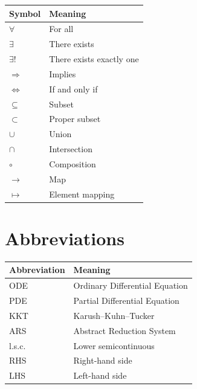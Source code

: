 \documentclass[11pt]{book}
\numberwithin{equation}{chapter}
\theoremstyle{definition}
\theoremstyle{plain}
\begin{document}
\begin{center}

\begin{tabular}{ll}

Symbol & Meaning
\\
\hline

$\forall$ &
For all
\\

$\exists$ &
There exists
\\

$\exists !$ &
There exists exactly one
\\

$\Rightarrow$ &
Implies
\\

$\Leftrightarrow$ &
If and only if
\\

$\subseteq$ &
Subset
\\

$\subset$ &
Proper subset
\\

$\cup$ &
Union
\\

$\cap$ &
Intersection
\\

$\circ$ &
Composition
\\

$\longrightarrow$ &
Map
\\

$\mapsto$ &
Element mapping

\end{tabular}

\end{center}


\section{Abbreviations}

\begin{center}

\begin{tabular}{ll}

Abbreviation & Meaning
\\
\hline

ODE &
Ordinary Differential Equation
\\

PDE &
Partial Differential Equation
\\

KKT &
Karush--Kuhn--Tucker
\\

ARS &
Abstract Reduction System
\\

l.s.c. &
Lower semicontinuous
\\

RHS &
Right-hand side
\\

LHS &
Left-hand side

\end{tabular}

\end{center}
\end{document}
